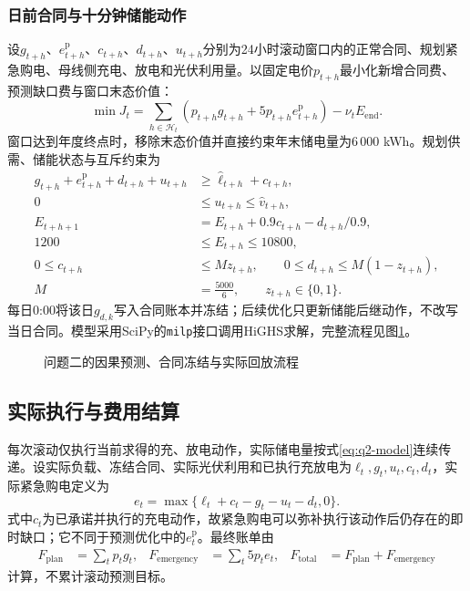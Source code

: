 \subsubsection{日前合同与十分钟储能动作}
设$g_{t+h}$、$e^{\mathrm p}_{t+h}$、$c_{t+h}$、$d_{t+h}$、$u_{t+h}$分别为24小时滚动窗口内的正常合同、规划紧急购电、母线侧充电、放电和光伏利用量。以固定电价$p_{t+h}$最小化新增合同费、预测缺口费与窗口末态价值：
\begin{equation}
 \min J_t=\sum_{h\in\mathcal H_t}
 \left(p_{t+h}g_{t+h}+5p_{t+h}e_{t+h}^{\mathrm p}\right)
 -\nu_tE_{\mathrm{end}}.
 \label{eq:q2-objective}
\end{equation}
窗口达到年度终点时，移除末态价值并直接约束年末储电量为6\,000 kWh。规划供需、储能状态与互斥约束为
\begin{align}
 g_{t+h}+e_{t+h}^{\mathrm p}+d_{t+h}+u_{t+h}
 &\ge\widehat\ell_{t+h}+c_{t+h},\\
 0&\le u_{t+h}\le\widehat v_{t+h},\\
 E_{t+h+1}&=E_{t+h}+0.9c_{t+h}-d_{t+h}/0.9,\\
 1200&\le E_{t+h}\le10800,\\
 0\le c_{t+h}&\le Mz_{t+h},\qquad
 0\le d_{t+h}\le M(1-z_{t+h}),\\
 M&=\frac{5000}{6},\qquad z_{t+h}\in\{0,1\}.
 \label{eq:q2-model}
\end{align}
每日0:00将该日$g_{d,k}$写入合同账本并冻结；后续优化只更新储能后继动作，不改写当日合同。模型采用SciPy的\texttt{milp}接口调用HiGHS求解\cite{scipyMilp,highs}，完整流程见图\ref{fig:q2-workflow}。

\begin{figure}[H]
  \centering
  \caption{问题二的因果预测、合同冻结与实际回放流程}
  \label{fig:q2-workflow}
\end{figure}

\subsection{实际执行与费用结算}
每次滚动仅执行当前求得的充、放电动作，实际储电量按式\eqref{eq:q2-model}连续传递。设实际负载、冻结合同、实际光伏利用和已执行充放电为$\ell_t,g_t,u_t,c_t,d_t$，实际紧急购电定义为
\begin{equation}
 e_t=\max\{\ell_t+c_t-g_t-u_t-d_t,0\}.
 \label{eq:q2-replay-emergency}
\end{equation}
式中$c_t$为已承诺并执行的充电动作，故紧急购电可以弥补执行该动作后仍存在的即时缺口；它不同于预测优化中的$e_t^{\mathrm p}$。最终账单由
\begin{align}
 F_{\mathrm{plan}}&=\sum_tp_tg_t,&
 F_{\mathrm{emergency}}&=\sum_t5p_te_t,&
 F_{\mathrm{total}}&=F_{\mathrm{plan}}+F_{\mathrm{emergency}}
 \label{eq:q2-cost}
\end{align}
计算，不累计滚动预测目标。


